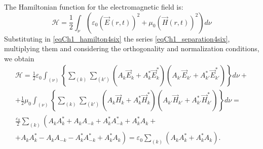 The Hamiltonian function for the electromagnetic field is:
\begin{equation}
\mathcal{H} = \frac{1}{2}
\int_{\nu}\left( \varepsilon_0\left(\vec{E}\left(r,t\right)\right)^2 + \mu_0
\left(\vec{H}\left(r,t\right)\right)^2\right) d\nu
\label{eqCh1_hamilton4six}
\end{equation}
Substituting in \eqref{eqCh1_hamilton4six} the series
\eqref{eqCh1_separation4six}, multiplying them and considering the orthogonality
and normalization conditions, we obtain
\begin{eqnarray}
\mathcal{H} = \frac{1}{2} \varepsilon_0
\int_{(\nu)}\left\{
\sum_{(k)}\sum_{(k')}
\left(A_k\vec{E}_k + A_k^{*}\vec{E}_k^{*}\right)
\left(A_{k'}\vec{E}_{k'} + A_{k'}^{*}\vec{E}_{k'}^{*}\right)
\right\}d \nu +
\nonumber \\
+ 
\frac{1}{2} \mu_0
\int_{(\nu)}\left\{
\sum_{(k)}\sum_{(k')}
\left(A_k\vec{H}_k + A_k^{*}\vec{H}_k^{*}\right)
\left(A_{k'}\vec{H}_{k'} + A_{k'}^{*}\vec{H}_{k'}^{*}\right)
\right\} d \nu = 
\nonumber \\
\frac{\varepsilon_0}{2} \sum_{(k)} 
\left(
A_k A_k^{*} + A_k A_{-k} + A_k^{*} A_{-k}^{*} + A_k^{*} A_k +
\right.
\nonumber \\
\left.
+ A_k A_k^{*} - A_k A_{-k} - A_k^{*} A_{-k}^{*} + A_k^{*} A_k
\right) = \varepsilon_0 \sum_{(k)} 
\left(A_k A_k^{*} + A_k^{*} A_k \right).
\label{eqCh1_separation4hamilton}
\end{eqnarray}